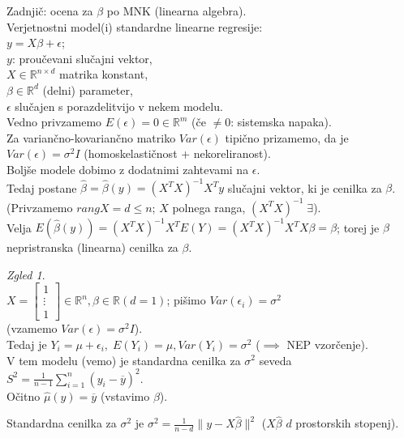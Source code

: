 \documentclass[a4paper, 12pt]{book}
\theoremstyle{definition}
\theoremstyle{remark}
\newtheorem*{exmp}{Zgled}
\newcommand{\R}{\mathbb{R}}
\begin{document}
Zadnjič: ocena za $\beta$ po MNK (linearna algebra). \\
Verjetnostni model(i) standardne linearne regresije: \\
$y = X \beta + \epsilon$; \\
$y$: proučevani slučajni vektor, \\
$X \in \R^{n \times d}$ matrika konstant, \\
$\beta \in \R^d$ (delni) parameter, \\
$\epsilon$ slučajen s porazdelitvijo v nekem modelu. \\
Vedno privzamemo $E(\epsilon) = 0 \in \R^m$ (če $\neq 0$: sistemska napaka). \\
Za variančno-kovariančno matriko $Var(\epsilon)$ tipično prizamemo, da je \\
$Var(\epsilon) = \sigma^2 I$ (homoskelastičnost + nekoreliranost). \\
Boljše modele dobimo z dodatnimi zahtevami na $\epsilon$. \\
Tedaj postane $\hat{\beta} = \hat{\beta}(y) = (X^TX)^{-1} X^T y$ slučajni vektor, ki je cenilka za $\beta$.
(Privzamemo $rang X = d \leq n$; $X$ polnega ranga, $(X^TX)^{-1} \; \exists$). \\
Velja $E\left(\hat{\beta}(y)\right) = (X^TX)^{-1} X^T E(Y) = (X^TX)^{-1} X^TX \beta = \beta$;
torej je $\beta$ nepristranska (linearna) cenilka za $\beta$.
\begin{exmp} \text{} \\
  $X = \begin{bmatrix}1 \\\vdots \\ 1\end{bmatrix} \in \R^n, \beta \in \R (d=1)$;
  pišimo $Var(\epsilon_i) = \sigma^2$ \\
  (vzamemo $Var(\epsilon) = \sigma^2 I$). \\
  Tedaj je $Y_i = \mu + \epsilon_i, \; E(Y_i) = \mu, Var(Y_i) = \sigma^2$ ($\implies$ NEP vzorčenje). \\
  V tem modelu (vemo) je standardna cenilka za $\sigma^2$ seveda \\
  $S^2 = \frac{1}{n-1} \sum_{i=1}^n (y_i - \overline{y})^2$. \\
  Očitno $\hat{\mu}(y) = \overline{y}$ (vstavimo $\beta$).
\end{exmp} 
Standardna cenilka za $\sigma^2$ je $\sigma^2 = \frac{1}{n-d} \lVert y - X \hat{\beta} \rVert^2$
($X \hat{\beta}$  $d$ prostorskih stopenj). \\
\end{document}
